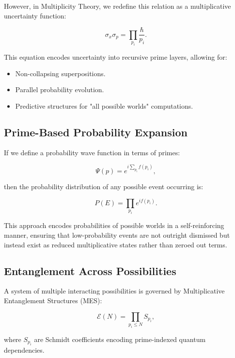 \documentclass{article}
\theoremstyle{plain}
\begin{document}
However, in Multiplicity Theory, we redefine this relation as a multiplicative uncertainty function:

\begin{equation}
\sigma_x \sigma_p = \prod_{p_i} \frac{\hbar}{p_i}.
\end{equation}

This equation encodes uncertainty into recursive prime layers, allowing for:

\begin{itemize}
    \item Non-collapsing superpositions.
    \item Parallel probability evolution.
    \item Predictive structures for "all possible worlds" computations.
\end{itemize}

\subsection{Prime-Based Probability Expansion}

If we define a probability wave function in terms of primes:

\begin{equation}
\Psi(p) = e^{i \sum_{p_i} f(p_i)},
\end{equation}

then the probability distribution of any possible event occurring is:

\begin{equation}
P(E) = \prod_{p_i} e^{i f(p_i)}.
\end{equation}

This approach encodes probabilities of possible worlds in a self-reinforcing manner, ensuring that low-probability events are not outright dismissed but instead exist as reduced multiplicative states rather than zeroed out terms.

\subsection{Entanglement Across Possibilities}

A system of multiple interacting possibilities is governed by Multiplicative Entanglement Structures (MES):

\begin{equation}
\mathcal{E}(N) = \prod_{p_i \leq N} S_{p_i},
\end{equation}

where \( S_{p_i} \) are Schmidt coefficients encoding prime-indexed quantum dependencies.
\end{document}
